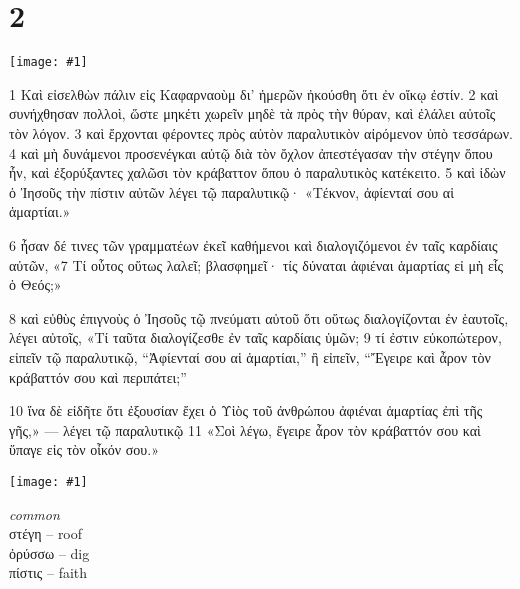 \documentclass[10pt,a5paper,twoside,twocolumn]{book}
\newcommand{\fig}[1]{\texttt{[image: \#1]}\label{fig:#1}}
\newcommand*\cleartoleftpage{%
  \ifodd\value{page}\hbox{}\clearpage\fi
}
\newenvironment{facing}{\cleartoleftpage}{\clearpage\pagebreak}
\newenvironment{help}{\clearpage}{}
\newenvironment{helpsec}{\begin{minipage}[t]{\textwidth}\begin{multicols}{2}}{\end{multicols}\end{minipage}}
\newenvironment{vocab}{\begin{helpsec}}{\end{helpsec}}
\begin{document}

\chapter{2}

\begin{facing}

\fig{02-04} %

	1 Καὶ εἰσελθὼν πάλιν εἰς Καφαρναοὺμ δι’ ἡμερῶν ἠκούσθη ὅτι ἐν οἴκῳ ἐστίν. 2 καὶ συνήχθησαν πολλοὶ, ὥστε μηκέτι χωρεῖν μηδὲ τὰ πρὸς τὴν θύραν, καὶ ἐλάλει αὐτοῖς τὸν λόγον. 3 καὶ ἔρχονται φέροντες πρὸς αὐτὸν παραλυτικὸν αἰρόμενον ὑπὸ τεσσάρων. 4 καὶ μὴ δυνάμενοι προσενέγκαι αὐτῷ διὰ τὸν ὄχλον ἀπεστέγασαν τὴν στέγην ὅπου ἦν, καὶ ἐξορύξαντες χαλῶσι τὸν κράβαττον ὅπου ὁ παραλυτικὸς κατέκειτο. 
5 καὶ ἰδὼν ὁ Ἰησοῦς τὴν πίστιν αὐτῶν λέγει τῷ παραλυτικῷ· «Τέκνον, ἀφίενταί σου αἱ ἁμαρτίαι.»

 6 ἦσαν δέ τινες τῶν γραμματέων ἐκεῖ καθήμενοι καὶ διαλογιζόμενοι ἐν ταῖς καρδίαις αὐτῶν, «7 Τί οὗτος οὕτως λαλεῖ; βλασφημεῖ· τίς δύναται ἀφιέναι ἁμαρτίας εἰ μὴ εἷς ὁ Θεός;»

8 καὶ εὐθὺς ἐπιγνοὺς ὁ Ἰησοῦς τῷ πνεύματι αὐτοῦ ὅτι οὕτως διαλογίζονται ἐν ἑαυτοῖς, λέγει αὐτοῖς, «Τί ταῦτα διαλογίζεσθε ἐν ταῖς καρδίαις ὑμῶν; 
9 τί ἐστιν εὐκοπώτερον, εἰπεῖν τῷ παραλυτικῷ, ``Ἀφίενταί σου αἱ ἁμαρτίαι,'' ἢ εἰπεῖν, ``Ἔγειρε καὶ ἆρον τὸν κράβαττόν σου καὶ περιπάτει;''

10 ἵνα δὲ εἰδῆτε ὅτι ἐξουσίαν ἔχει ὁ Υἱὸς τοῦ ἀνθρώπου ἀφιέναι ἁμαρτίας ἐπὶ τῆς γῆς,» — λέγει τῷ παραλυτικῷ 11 «Σοὶ λέγω, ἔγειρε ἆρον τὸν κράβαττόν σου καὶ ὕπαγε εἰς τὸν οἶκόν σου.»

\fig{02-06} %



\begin{help}
\begin{vocab}

\emph{common}\\
στέγη -- roof \\
ὀρύσσω -- dig \\
πίστις -- faith \\


\end{vocab}
\end{help}
\end{facing}
\end{document}
